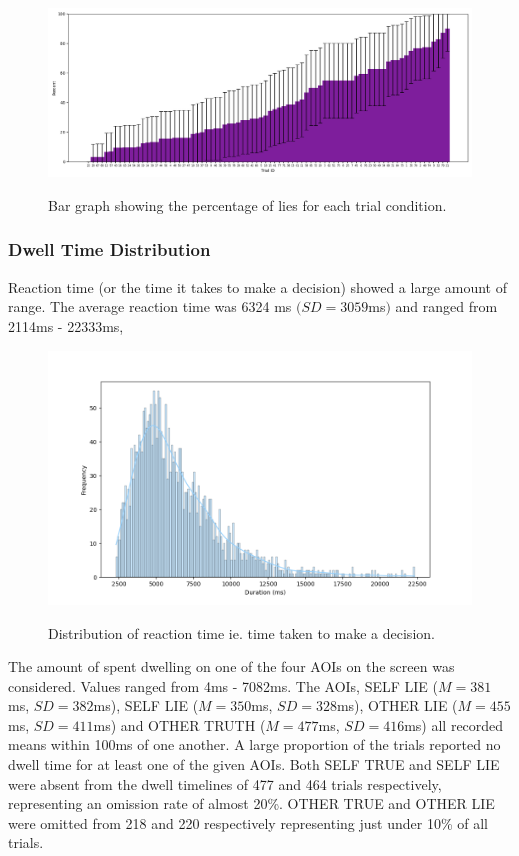 \documentclass[man, floatsintext]{apa7}
\begin{document}
\begin{figure}[H]
	\includegraphics[width=\linewidth]{../plots/RESPONSE/TRIALIDPercentLies.png}
	\label{fig:TRIALIDPercentLies}
	\caption{Bar graph showing the percentage of lies for each trial condition.}
\end{figure}

\subsubsection{Dwell Time Distribution}

Reaction time (or the time it takes to make a decision) showed a large amount of range. The average reaction time was 6324 ms $(SD = 3059$ms$)$ and ranged from 2114ms - 22333ms,

\begin{figure}[H]
	\includegraphics[width=\linewidth]{../plots/Dwell/RTDistPlot.png}
	\label{fig:RTDistPlot}
	\caption{Distribution of reaction time ie. time taken to make a decision.}
\end{figure}

The amount of spent dwelling on one of the four AOIs on the screen was considered. Values ranged from 4ms - 7082ms. The AOIs, SELF LIE ($M = 381$ms, $SD = 382$ms), SELF LIE ($M = 350$ms, $SD = 328$ms), OTHER LIE ($M = 455$ms, $SD = 411$ms) and OTHER TRUTH ($M = 477$ms, $SD = 416$ms) all recorded means within 100ms of one another. A large proportion of the trials reported no dwell time for at least one of the given AOIs. Both SELF TRUE and SELF LIE  were absent from the dwell timelines of 477 and 464 trials respectively, representing an omission rate of almost 20\%. OTHER TRUE and OTHER LIE were omitted from 218 and 220 respectively representing just under 10\% of all trials.
\end{document}
